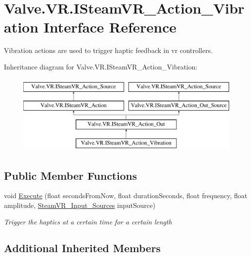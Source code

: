\hypertarget{interface_valve_1_1_v_r_1_1_i_steam_v_r___action___vibration}{}\section{Valve.\+V\+R.\+I\+Steam\+V\+R\+\_\+\+Action\+\_\+\+Vibration Interface Reference}
\label{interface_valve_1_1_v_r_1_1_i_steam_v_r___action___vibration}


Vibration actions are used to trigger haptic feedback in vr controllers.  


Inheritance diagram for Valve.\+V\+R.\+I\+Steam\+V\+R\+\_\+\+Action\+\_\+\+Vibration\+:\begin{figure}[H]
\begin{center}
\leavevmode
\includegraphics[height=4.000000cm]{interface_valve_1_1_v_r_1_1_i_steam_v_r___action___vibration}
\end{center}
\end{figure}
\subsection*{Public Member Functions}
\begin{DoxyCompactItemize}
\item 
void \mbox{\hyperlink{interface_valve_1_1_v_r_1_1_i_steam_v_r___action___vibration_ae2fe2fad9afefaafa8d33ed374ecee30}{Execute}} (float seconds\+From\+Now, float duration\+Seconds, float frequency, float amplitude, \mbox{\hyperlink{namespace_valve_1_1_v_r_a82e5bf501cc3aa155444ee3f0662853f}{Steam\+V\+R\+\_\+\+Input\+\_\+\+Sources}} input\+Source)
\begin{DoxyCompactList}\small\item\em Trigger the haptics at a certain time for a certain length \end{DoxyCompactList}\end{DoxyCompactItemize}
\subsection*{Additional Inherited Members}


